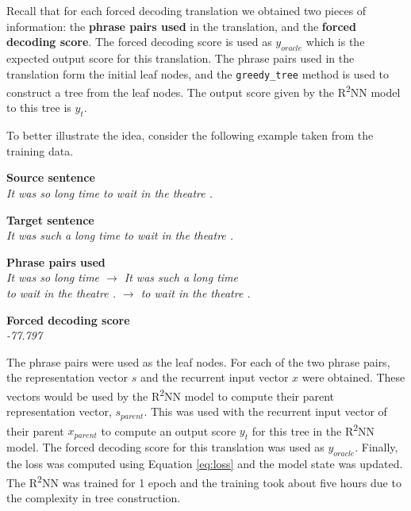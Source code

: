 \documentclass[12pt,a4paper,twoside]{report}
\begin{document}
Recall that for each forced decoding translation we obtained two pieces of information: the \textbf{phrase pairs used} in the translation, and the \textbf{forced decoding score}. The forced decoding score is used as $y_{oracle}$ which is the expected output score for this translation. The phrase pairs used in the translation form the initial leaf nodes, and the \texttt{greedy\_tree} method is used to construct a tree from the leaf nodes. The output score given by the R\textsuperscript{2}NN model to this tree is $y_t$.

To better illustrate the idea, consider the following example taken from the training data.

\hfill\begin{minipage}{\dimexpr\textwidth-0.8cm}
    \vspace*{1mm}
    \textbf{Source sentence}\\
    \textit{It was so long time to wait in the theatre .}

    \vspace*{1mm}

    \textbf{Target sentence}\\
    \textit{It was such a long time to wait in the theatre .}

    \vspace*{1mm}

    \textbf{Phrase pairs used}\\
    \textit{It was so long time $\rightarrow$ It was such a long time}\\
    \textit{to wait in the theatre . $\rightarrow$ to wait in the theatre .}

    \vspace*{1mm}

    \textbf{Forced decoding score}\\
    \textit{-77.797}
    \vspace*{1mm}
\end{minipage}

The phrase pairs were used as the leaf nodes. For each of the two phrase pairs, the representation vector $s$ and the recurrent input vector $x$ were obtained. These vectors would be used by the R\textsuperscript{2}NN model to compute their parent representation vector, $s_{parent}$. This was used with the recurrent input vector of their parent $x_{parent}$ to compute an output score $y_t$ for this tree in the R\textsuperscript{2}NN model. The forced decoding score for this translation was used as $y_{oracle}$. Finally, the loss was computed using Equation \ref{eq:loss} and the model state was updated. The R\textsuperscript{2}NN was trained for 1 epoch and the training took about five hours due to the complexity in tree construction.
\end{document}

